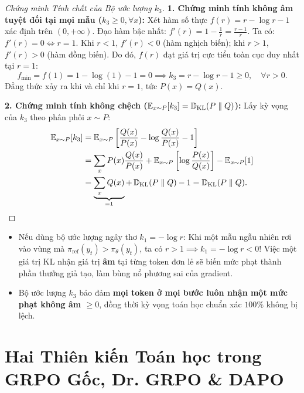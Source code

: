 \begin{proof}[Chứng minh Tính chất của Bộ ước lượng $k_3$]
\textbf{1. Chứng minh tính không âm tuyệt đối tại mọi mẫu ($k_3 \ge 0, \forall x$):}
Xét hàm số thực $f(r) = r - \log r - 1$ xác định trên $(0, +\infty)$.
Đạo hàm bậc nhất: $f'(r) = 1 - \frac{1}{r} = \frac{r - 1}{r}$.
Ta có: $f'(r) = 0 \iff r = 1$. Khi $r < 1$, $f'(r) < 0$ (hàm nghịch biến); khi $r > 1$, $f'(r) > 0$ (hàm đồng biến).
Do đó, $f(r)$ đạt giá trị cực tiểu toàn cục duy nhất tại $r = 1$:
\begin{equation}
    f_{\min} = f(1) = 1 - \log(1) - 1 = 0 \implies k_3 = r - \log r - 1 \ge 0, \quad \forall r > 0.
\end{equation}
Đẳng thức xảy ra khi và chỉ khi $r = 1$, tức $P(x) = Q(x)$.

\textbf{2. Chứng minh tính không chệch ($\operatorname{\mathbb{E}}_{x \sim P}[k_3] = \operatorname{\mathbb{D}_{\mathrm{KL}}}(P \parallel Q)$):}
Lấy kỳ vọng của $k_3$ theo phân phối $x \sim P$:
\begin{align}
    \operatorname{\mathbb{E}}_{x \sim P}[k_3] &= \operatorname{\mathbb{E}}_{x \sim P} \left[ \frac{Q(x)}{P(x)} - \log \frac{Q(x)}{P(x)} - 1 \right] \nonumber \\
    &= \sum_{x} P(x) \frac{Q(x)}{P(x)} + \operatorname{\mathbb{E}}_{x \sim P}\left[ \log \frac{P(x)}{Q(x)} \right] - \operatorname{\mathbb{E}}_{x \sim P}[1] \nonumber \\
    &= \underbrace{\sum_{x} Q(x)}_{= 1} + \operatorname{\mathbb{D}_{\mathrm{KL}}}(P \parallel Q) - 1 = \operatorname{\mathbb{D}_{\mathrm{KL}}}(P \parallel Q).
\end{align}
\end{proof}

\begin{pedagogy}
\begin{itemize}[leftmargin=1.2cm]
    \item Nếu dùng bộ ước lượng ngây thơ $k_1 = -\log r$: Khi một mẫu ngẫu nhiên rơi vào vùng mà $\pi_{\text{ref}}(y_t) > \pi_\theta(y_t)$, ta có $r > 1 \implies k_1 = -\log r < 0$! Việc một giá trị KL nhận giá trị \textbf{âm} tại từng token đơn lẻ sẽ biến mức phạt thành phần thưởng giả tạo, làm bùng nổ phương sai của gradient.
    \item Bộ ước lượng $k_3$ bảo đảm \textbf{mọi token ở mọi bước luôn nhận một mức phạt không âm $\ge 0$}, đồng thời kỳ vọng toán học chuẩn xác $100\%$ không bị lệch.
\end{itemize}
\end{pedagogy}

\section{Hai Thiên kiến Toán học trong GRPO Gốc, Dr. GRPO \& DAPO}
\label{sec:dr_grpo_dapo}

